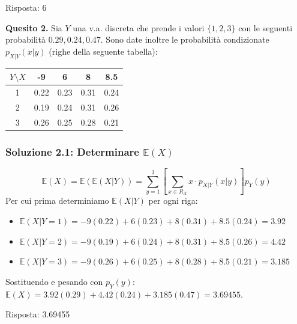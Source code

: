 \documentclass[12pt, a4paper]{article}
\begin{document}
Risposta: 6

\vspace{0.5cm}
\begin{tcolorbox}[colback=lightergray!10, colframe=tocsec]
\textbf{Quesito 2.} Sia $Y$ una v.a. discreta che prende i valori $\{1,2,3\}$ con le seguenti probabilità $0.29, 0.24, 0.47$.
Sono date inoltre le probabilità condizionate $p_{X|Y}(x|y)$ (righe della seguente tabella):
\begin{center}
\begin{tabular}{c|cccc}
\toprule
$Y \setminus X$ & -9 & 6 & 8 & 8.5 \\
\midrule
1 & 0.22 & 0.23 & 0.31 & 0.24 \\
2 & 0.19 & 0.24 & 0.31 & 0.26 \\
3 & 0.26 & 0.25 & 0.28 & 0.21 \\
\bottomrule
\end{tabular}
\end{center}
\end{tcolorbox}

\subsubsection*{Soluzione 2.1: Determinare $\mathbb{E}(X)$}
$$ \mathbb{E}(X) = \mathbb{E}(\mathbb{E}(X|Y)) = \sum_{y=1}^3 \left[ \sum_{x \in R_X} x \cdot p_{X|Y}(x|y) \right] p_Y(y) $$
Per cui prima determiniamo $\mathbb{E}(X|Y)$ per ogni riga:
\begin{itemize}
    \item $\mathbb{E}(X|Y=1) = -9(0.22) + 6(0.23) + 8(0.31) + 8.5(0.24) = 3.92$
    \item $\mathbb{E}(X|Y=2) = -9(0.19) + 6(0.24) + 8(0.31) + 8.5(0.26) = 4.42$
    \item $\mathbb{E}(X|Y=3) = -9(0.26) + 6(0.25) + 8(0.28) + 8.5(0.21) = 3.185$
\end{itemize}
Sostituendo e pesando con $p_Y(y)$: $\mathbb{E}(X) = 3.92(0.29) + 4.42(0.24) + 3.185(0.47) = 3.69455$.

Risposta: 3.69455
\end{document}
